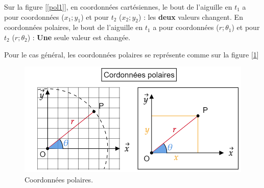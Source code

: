 \documentclass[
	11pt, %
	fleqn, %
	a4paper, %
]{LegrandOrangeBook}
\begin{document}
Sur la figure [\ref{pol1}], en coordonnées cartésiennes, le bout de l'aiguille en $t_1$ a pour coordonnées ($x_1; y_1$) et pour $t_2$ ($x_2 ; y_2$) : les \textbf{deux} valeurs changent. 
En coordonnées polaires, le bout de l'aiguille en $t_1$ a pour coordonnées ($r ; \theta_1$) et pour $t_2$ ($r ; \theta_2 $) : \textbf{Une} seule valeur est changée.

Pour le cas général, les coordonnées polaires se représente comme sur la figure [\ref{pol2}]

\begin{figure}[H] %
	\centering %
	\includegraphics[width=1\textwidth]{Images/pol2.png} %
	\caption{Coordonnées polaires.}
	\label{pol2} %
\end{figure}
\end{document}
